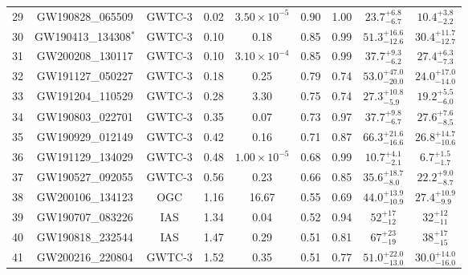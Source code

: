 \begin{table*}[ht]
\begin{tabular}{!{\vrule width 1pt}lcccccccc!{\vrule width 1pt}}
29 & GW190828\_065509 & GWTC-3 & 0.02 & $3.50 \times 10^{-5}$ & 0.90 & 1.00 & $23.7^{+6.8}_{-6.7}$ & $10.4^{+3.8}_{-2.2}$ \\
30 & GW190413\_134308$^{*}$ & GWTC-3 & 0.10 & 0.18 & 0.85 & 0.99 & $51.3^{+16.6}_{-12.6}$ & $30.4^{+11.7}_{-12.7}$ \\
31 & GW200208\_130117 & GWTC-3 & 0.10 & $3.10 \times 10^{-4}$ & 0.85 & 0.99 & $37.7^{+9.3}_{-6.2}$ & $27.4^{+6.3}_{-7.3}$ \\
32 & GW191127\_050227 & GWTC-3 & 0.18 & 0.25 & 0.79 & 0.74 & $53.0^{+47.0}_{-20.0}$ & $24.0^{+17.0}_{-14.0}$ \\
33 & GW191204\_110529 & GWTC-3 & 0.28 & 3.30 & 0.75 & 0.74 & $27.3^{+10.8}_{-5.9}$ & $19.2^{+5.5}_{-6.0}$ \\
34 & GW190803\_022701 & GWTC-3 & 0.35 & 0.07 & 0.73 & 0.97 & $37.7^{+9.8}_{-6.7}$ & $27.6^{+7.6}_{-8.5}$ \\
35 & GW190929\_012149 & GWTC-3 & 0.42 & 0.16 & 0.71 & 0.87 & $66.3^{+21.6}_{-16.6}$ & $26.8^{+14.7}_{-10.6}$ \\
36 & GW191129\_134029 & GWTC-3 & 0.48 & $1.00 \times 10^{-5}$ & 0.68 & 0.99 & $10.7^{+4.1}_{-2.1}$ & $6.7^{+1.5}_{-1.7}$ \\
37 & GW190527\_092055 & GWTC-3 & 0.56 & 0.23 & 0.66 & 0.85 & $35.6^{+18.7}_{-8.0}$ & $22.2^{+9.0}_{-8.7}$ \\
38 & GW200106\_134123 & OGC & 1.16 & 16.67 & 0.55 & 0.69 & $44.0^{+13.9}_{-10.9}$ & $27.4^{+10.9}_{-9.9}$ \\
39 & GW190707\_083226 & IAS & 1.34 & 0.04 & 0.52 & 0.94 & $52_{-12}^{+17}$ & $32_{-11}^{+12}$ \\
40 & GW190818\_232544 & IAS & 1.47 & 0.29 & 0.51 & 0.81 & $67_{-19}^{+23}$ & $38_{-15}^{+17}$ \\
41 & GW200216\_220804 & GWTC-3 & 1.52 & 0.35 & 0.51 & 0.77 & $51.0^{+22.0}_{-13.0}$ & $30.0^{+14.0}_{-16.0}$ \\
\bottomrule[1pt]
\end{tabular}

\end{table*}